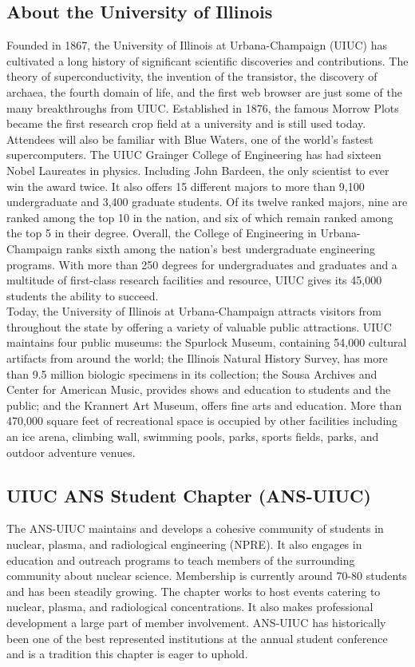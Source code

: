 \documentclass[12pt, letterpaper]{article}
\begin{document}
\subsection{About the University of Illinois}
Founded in 1867, the University of Illinois at Urbana-Champaign (UIUC) has cultivated a long history of significant scientific discoveries and contributions. The theory of superconductivity, the invention of the transistor, the discovery of archaea, the fourth domain of life, and the first web browser are just some of the many breakthroughs from UIUC. Established in 1876, the famous Morrow Plots became the first research crop field at a university and is still used today. Attendees will also be familiar with Blue Waters, one of the world’s fastest supercomputers. 
The UIUC Grainger College of Engineering has had sixteen Nobel Laureates in physics. Including John Bardeen, the only scientist to ever win the award twice. It also offers 15 different majors to more than 9,100 undergraduate and 3,400 graduate students. Of its twelve ranked majors, nine are ranked among the top 10 in the nation, and six of which remain ranked among the top 5 in their degree. Overall, the College of Engineering in Urbana-Champaign ranks sixth among the nation’s best undergraduate engineering programs. With more than 250 degrees for undergraduates and graduates and a multitude of first-class research facilities and resource, UIUC gives its 45,000 students the ability to succeed.\\
Today, the University of Illinois at Urbana-Champaign attracts visitors from throughout the state by offering a variety of valuable public attractions. UIUC maintains four public museums: the Spurlock Museum, containing 54,000 cultural artifacts from around the world; the Illinois Natural History Survey, has more than 9.5 million biologic specimens in its collection; the Sousa Archives and Center for American Music, provides shows and education to students and the public; and the Krannert Art Museum, offers fine arts and education. More than 470,000 square feet of recreational space is occupied by other facilities including an ice arena, climbing wall, swimming pools, parks, sports fields, parks, and outdoor adventure venues. 

\subsection{UIUC ANS Student Chapter (ANS-UIUC)}
The ANS-UIUC maintains and develops a cohesive community of students in nuclear, plasma, and radiological engineering (NPRE). It also engages in education and outreach programs to teach members of the surrounding community about nuclear science. Membership is currently around 70-80 students and has been steadily growing. The chapter works to host events catering to nuclear, plasma, and radiological concentrations. It also makes professional development a large part of member involvement. ANS-UIUC has historically been one of the best represented institutions at the annual student conference and is a tradition this chapter is eager to uphold. 
\end{document}
